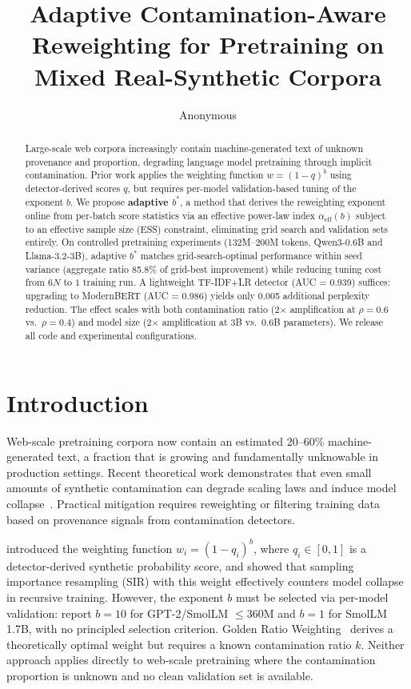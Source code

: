 \documentclass[11pt,a4paper]{article}
\title{Adaptive Contamination-Aware Reweighting for Pretraining on\\Mixed Real-Synthetic Corpora}
\author{Anonymous}
\newcommand{\bstar}{b^{*}}
\newcommand{\aeff}{\alpha_{\mathrm{eff}}}
\begin{document}
\maketitle

\begin{abstract}
Large-scale web corpora increasingly contain machine-generated text of unknown provenance and proportion, degrading language model pretraining through implicit contamination.
Prior work applies the weighting function $w = (1-q)^b$ using detector-derived scores $q$, but requires per-model validation-based tuning of the exponent $b$.
We propose \textbf{adaptive $\bstar$}, a method that derives the reweighting exponent online from per-batch score statistics via an effective power-law index $\aeff(b)$ subject to an effective sample size (ESS) constraint, eliminating grid search and validation sets entirely.
On controlled pretraining experiments (132M--200M tokens, Qwen3-0.6B and Llama-3.2-3B), adaptive $\bstar$ matches grid-search-optimal performance within seed variance (aggregate ratio 85.8\% of grid-best improvement) while reducing tuning cost from $6N$ to $1$ training run.
A lightweight TF-IDF+LR detector (AUC = 0.939) suffices: upgrading to ModernBERT (AUC = 0.986) yields only 0.005 additional perplexity reduction.
The effect scales with both contamination ratio (2$\times$ amplification at $\rho{=}0.6$ vs.\ $\rho{=}0.4$) and model size (2$\times$ amplification at 3B vs.\ 0.6B parameters).
We release all code and experimental configurations.
\end{abstract}

\section{Introduction}
\label{sec:intro}

Web-scale pretraining corpora now contain an estimated 20--60\% machine-generated text, a fraction that is growing and fundamentally unknowable in production settings.
Recent theoretical work demonstrates that even small amounts of synthetic contamination can degrade scaling laws and induce model collapse~\cite{shumailov2024strong}.
Practical mitigation requires reweighting or filtering training data based on provenance signals from contamination detectors.

\citet{drayson2025} introduced the weighting function $w_i = (1-q_i)^b$, where $q_i \in [0,1]$ is a detector-derived synthetic probability score, and showed that sampling importance resampling (SIR) with this weight effectively counters model collapse in recursive training.
However, the exponent $b$ must be selected via per-model validation: \citet{drayson2025} report $b{=}10$ for GPT-2/SmolLM $\leq$360M and $b{=}1$ for SmolLM 1.7B, with no principled selection criterion.
Golden Ratio Weighting~\cite{goldenratio2025} derives a theoretically optimal weight but requires a known contamination ratio $k$.
Neither approach applies directly to web-scale pretraining where the contamination proportion is unknown and no clean validation set is available.
\end{document}
